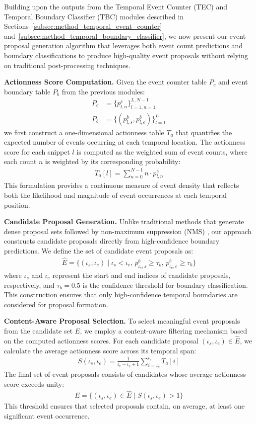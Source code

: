 Building upon the outputs from the Temporal Event Counter (TEC) and Temporal Boundary Classifier (TBC) modules described in Sections~\ref{subsec:method_temporal_event_counter} and~\ref{subsec:method_temporal_boundary_classifier}, we now present our event proposal generation algorithm that leverages both event count predictions and boundary classifications to produce high-quality event proposals without relying on traditional post-processing techniques.

\textbf{Actionness Score Computation.}
Given the event counter table $P_c$ and event boundary table $P_b$ from the previous modules:
\begin{align}
  P_c &= \{p_{l,n}^c\}_{l=1,n=1}^{L, N-1} \\
  P_b &= \{(p_{l,s}^b, p_{l,e}^b)\}_{l=1}^{L}
\end{align}
we first construct a one-dimensional actionness table $T_a$ that quantifies the expected number of events occurring at each temporal location. The actionness score for each snippet $l$ is computed as the weighted sum of event counts, where each count $n$ is weighted by its corresponding probability:
\begin{align}
  T_{a}[l] = \sum_{n=0}^{N-1} n \cdot p_{l,n}^c
\end{align}
This formulation provides a continuous measure of event density that reflects both the likelihood and magnitude of event occurrences at each temporal position.

\textbf{Candidate Proposal Generation.}
Unlike traditional methods that generate dense proposal sets followed by non-maximum suppression (NMS) \cite{hosang2017learning}, our approach constructs candidate proposals directly from high-confidence boundary predictions. We define the set of candidate event proposals as:
\begin{align}
  \hat{E} = \{(\iota_s, \iota_e) \mid \iota_s < \iota_e, \, p_{\iota_s,s}^b \geq \tau_b, \, p_{\iota_e,e}^b \geq \tau_b\}
\end{align}
where $\iota_s$ and $\iota_e$ represent the start and end indices of candidate proposals, respectively, and $\tau_b = 0.5$ is the confidence threshold for boundary classification. This construction ensures that only high-confidence temporal boundaries are considered for proposal formation.

\textbf{Content-Aware Proposal Selection.}
To select meaningful event proposals from the candidate set $\hat{E}$, we employ a content-aware filtering mechanism based on the computed actionness scores. For each candidate proposal $(\iota_s, \iota_e) \in \hat{E}$, we calculate the average actionness score across its temporal span:
\begin{align}
  S(\iota_s, \iota_e) = \frac{1}{\iota_e - \iota_s + 1} \sum_{i=\iota_s}^{\iota_e} T_a[i]
\end{align}
The final set of event proposals consists of candidates whose average actionness score exceeds unity:
\begin{align}
  E = \{(\iota_s, \iota_e) \in \hat{E} \mid S(\iota_s, \iota_e) > 1\}
\end{align}
This threshold ensures that selected proposals contain, on average, at least one significant event occurrence.


